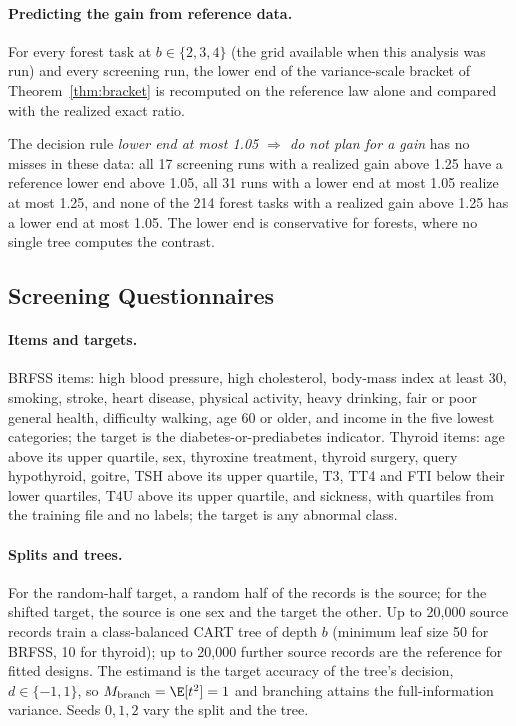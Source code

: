 \paragraph{Predicting the gain from reference data.}
For every forest task at $b\in\{2,3,4\}$ (the grid available when this analysis was run) and every screening run, the lower end of the variance-scale bracket of Theorem~\ref{thm:bracket} is recomputed on the reference law alone and compared with the realized exact ratio.

The decision rule \emph{lower end at most 1.05 $\Rightarrow$ do not plan for a gain} has no misses in these data: all 17 screening runs with a realized gain above 1.25 have a reference lower end above 1.05, all 31 runs with a lower end at most 1.05 realize at most 1.25, and none of the 214 forest tasks with a realized gain above 1.25 has a lower end at most 1.05. The lower end is conservative for forests, where no single tree computes the contrast.

\subsection{Screening Questionnaires}\label{app:screening}\label{app:screendetail}
\paragraph{Items and targets.}
BRFSS items: high blood pressure, high cholesterol, body-mass index at least 30, smoking, stroke, heart disease, physical activity, heavy drinking, fair or poor general health, difficulty walking, age 60 or older, and income in the five lowest categories; the target is the diabetes-or-prediabetes indicator. Thyroid items: age above its upper quartile, sex, thyroxine treatment, thyroid surgery, query hypothyroid, goitre, TSH above its upper quartile, T3, TT4 and FTI below their lower quartiles, T4U above its upper quartile, and sickness, with quartiles from the training file and no labels; the target is any abnormal class.

\paragraph{Splits and trees.}
For the random-half target, a random half of the records is the source; for the shifted target, the source is one sex and the target the other. Up to 20,000 source records train a class-balanced CART tree of depth $b$ (minimum leaf size 50 for BRFSS, 10 for thyroid); up to 20,000 further source records are the reference for fitted designs. The estimand is the target accuracy of the tree's decision, $d\in\{-1,1\}$, so $M_{\rm branch}=\E[t^2]=1$ and branching attains the full-information variance. Seeds $0,1,2$ vary the split and the tree.

